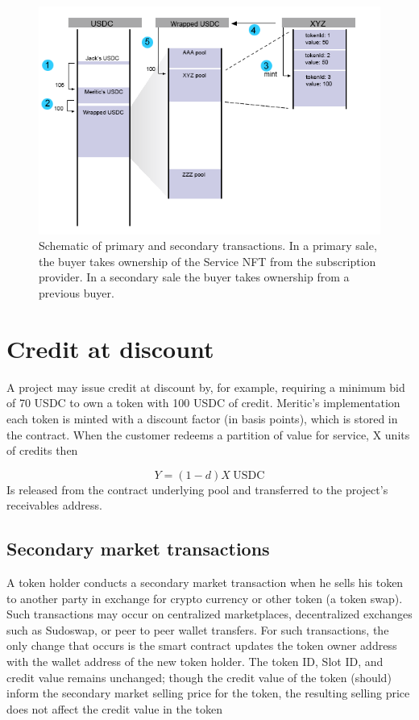 \documentclass[twoside]{article}
\begin{document}
\begin{figure}[ht!]
     \centering
     \label{schema}
      \caption{Schematic of primary and secondary transactions. In a primary sale, the buyer takes ownership of the Service NFT from the subscription provider. In a secondary sale the buyer takes ownership from a previous buyer. }
         \includegraphics[scale=0.75]{tokenized_credit_explainer.png}
\end{figure}



\section{Credit at discount}
A project may issue credit at discount by, for example,  requiring a minimum bid of 70 USDC to own a token with 100 USDC of credit. Meritic’s implementation each token is minted  with a discount factor (in basis points), which is stored in the contract. When the customer redeems a partition of value for service, X units of credits then 

\begin{equation}
Y=(1-d)X\hspace{3pt} \text{USDC}
\end{equation}
Is released from the contract underlying  pool and transferred to the project’s receivables address. 
\subsection{Secondary market transactions}
A token holder conducts a secondary  market transaction when he sells his token  to another party in exchange for crypto currency  or other token  (a token swap). Such transactions may occur on centralized marketplaces,  decentralized exchanges such as Sudoswap,  or peer to peer wallet transfers.  For such transactions, the only change that occurs is the smart contract updates the token owner address with the wallet address of the new token holder. The token ID, Slot ID, and credit value remains unchanged; though the credit value of the token (should) inform the secondary market selling price for the token, the resulting selling price does not affect the credit value in the token 
\end{document}
